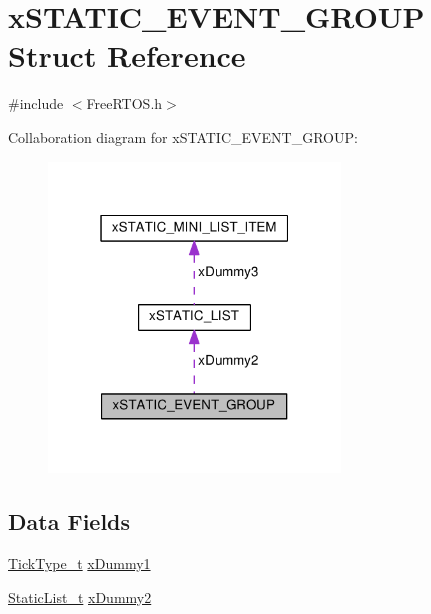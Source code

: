 \hypertarget{structxSTATIC__EVENT__GROUP}{}\section{x\+S\+T\+A\+T\+I\+C\+\_\+\+E\+V\+E\+N\+T\+\_\+\+G\+R\+O\+UP Struct Reference}
\label{structxSTATIC__EVENT__GROUP}


{\ttfamily \#include $<$Free\+R\+T\+O\+S.\+h$>$}



Collaboration diagram for x\+S\+T\+A\+T\+I\+C\+\_\+\+E\+V\+E\+N\+T\+\_\+\+G\+R\+O\+UP\+:\nopagebreak
\begin{figure}[H]
\begin{center}
\leavevmode
\includegraphics[width=220pt]{d3/d8a/structxSTATIC__EVENT__GROUP__coll__graph}
\end{center}
\end{figure}
\subsection*{Data Fields}
\begin{DoxyCompactItemize}
\item 
\hyperlink{portmacro_8h_aa69c48c6e902ce54f70886e6573c92a9}{Tick\+Type\+\_\+t} \hyperlink{structxSTATIC__EVENT__GROUP_a4ed0094f715dd8f79a354f42fd973fc6}{x\+Dummy1}
\item 
\hyperlink{FreeRTOS_8h_a9735ad9101a2bd25f83a62089a4acee6}{Static\+List\+\_\+t} \hyperlink{structxSTATIC__EVENT__GROUP_a17d070c972ecd0151d7505a539653551}{x\+Dummy2}
\end{DoxyCompactItemize}


